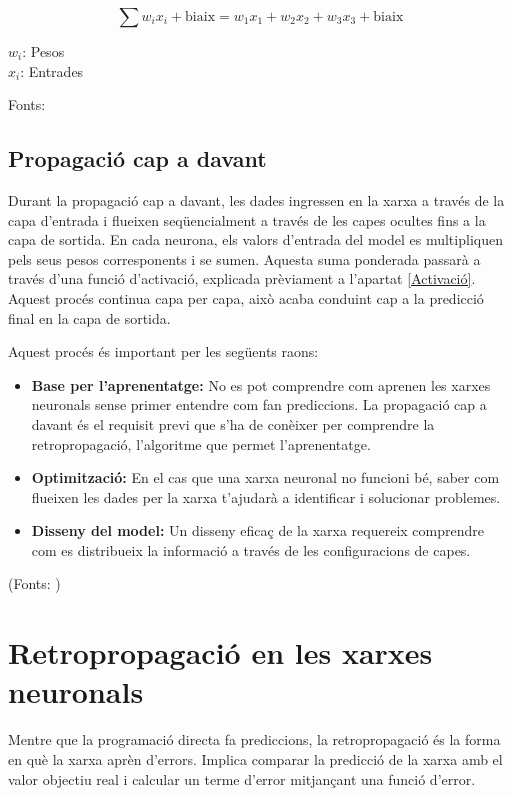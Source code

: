 $$
\sum w_i x_i + \text{biaix} = w_1 x_1 + w_2 x_2 + w_3 x_3 + \text{biaix}
$$

$w_i$: Pesos\\
$x_i$: Entrades

Fonts: \cite{IMB_Xarxa_neuronal}

\subsection{Propagació cap a davant}\label{subsec:propagació}

Durant la propagació cap a davant, les dades ingressen en la xarxa a través de la capa d'entrada i flueixen seqüencialment a través de les capes ocultes fins a la capa de sortida. En cada neurona, els valors d'entrada del model es multipliquen pels seus pesos corresponents i se sumen. Aquesta suma ponderada passarà a través d'una funció d'activació, explicada prèviament a l'apartat \ref{Activació}. Aquest procés continua capa per capa, això acaba conduint cap a la predicció final en la capa de sortida.

Aquest procés és important per les següents raons:
\begin{itemize}
    \item \textbf{Base per l'aprenentatge:} No es pot comprendre com aprenen les xarxes neuronals sense primer entendre com fan prediccions. La propagació cap a davant és el requisit previ que s'ha de conèixer per comprendre la retropropagació, l'algoritme que permet l'aprenentatge.

    \item \textbf{Optimització:} En el cas que una xarxa neuronal no funcioni bé, saber com flueixen les dades per la xarxa t'ajudarà a identificar i solucionar problemes.

    \item \textbf{Disseny del model:} Un disseny eficaç de la xarxa requereix comprendre com es distribueix la informació a través de les configuracions de capes.
\end{itemize}
(Fonts: \cite{TreballFinalDeGrau2})
\section{Retropropagació en les xarxes neuronals}\label{subsec:retropropagació}

Mentre que la programació directa fa prediccions, la retropropagació és la forma en què la xarxa aprèn d'errors. Implica comparar la predicció de la xarxa amb el valor objectiu real i calcular un terme d'error mitjançant una funció d'error.\\


